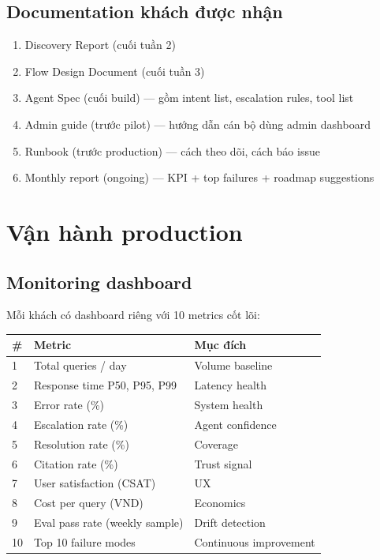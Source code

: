 \documentclass[11pt,a4paper]{article}
\begin{document}
\subsection{Documentation khách được nhận}

\begin{enumerate}
\item Discovery Report (cuối tuần 2)
\item Flow Design Document (cuối tuần 3)
\item Agent Spec (cuối build) --- gồm intent list, escalation rules, tool list
\item Admin guide (trước pilot) --- hướng dẫn cán bộ dùng admin dashboard
\item Runbook (trước production) --- cách theo dõi, cách báo issue
\item Monthly report (ongoing) --- KPI + top failures + roadmap suggestions
\end{enumerate}

\clearpage

\section{Vận hành production}

\subsection{Monitoring dashboard}

Mỗi khách có dashboard riêng với 10 metrics cốt lõi:

\begin{tabularx}{\linewidth}{@{}p{0.5cm} p{4cm} X@{}}
\toprule
\textbf{\#} & \textbf{Metric} & \textbf{Mục đích} \\
\midrule
1 & Total queries / day & Volume baseline \\
2 & Response time P50, P95, P99 & Latency health \\
3 & Error rate (\%) & System health \\
4 & Escalation rate (\%) & Agent confidence \\
5 & Resolution rate (\%) & Coverage \\
6 & Citation rate (\%) & Trust signal \\
7 & User satisfaction (CSAT) & UX \\
8 & Cost per query (VND) & Economics \\
9 & Eval pass rate (weekly sample) & Drift detection \\
10 & Top 10 failure modes & Continuous improvement \\
\bottomrule
\end{tabularx}
\end{document}
